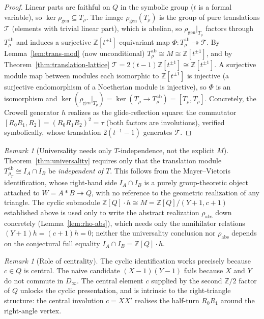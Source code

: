 \documentclass[11pt,a4paper]{article}
\theoremstyle{remark}
\newtheorem{remark}[theorem]{Remark}
\theoremstyle{plain}
\begin{document}
\begin{proof}
Linear parts are faithful on $Q$ in the symbolic group ($t$ is a formal
variable), so $\ker \rho_{\mathrm{gen}} \subseteq T_\rho$.  The
image $\rho_{\mathrm{gen}}(T_\rho)$ is the group of pure translations
$\mathcal{T}$ (elements with trivial linear part), which is abelian, so
$\rho_{\mathrm{gen}}|_{T_\rho}$ factors through
$T_\rho^{\mathrm{ab}}$ and induces a surjective
$\mathbb{Z}[t^{\pm 1}]$-equivariant map
$\Phi \colon T_\rho^{\mathrm{ab}} \twoheadrightarrow \mathcal{T}$.
By Lemma~\ref{lem:trans-mod} (now unconditional)
$T_\rho^{\mathrm{ab}} \cong M \cong \mathbb{Z}[t^{\pm 1}]$, and by
Theorem~\ref{thm:translation-lattice}
$\mathcal{T} = 2(t-1)\mathbb{Z}[t^{\pm 1}] \cong
\mathbb{Z}[t^{\pm 1}]$.  A surjective module map between modules each
isomorphic to $\mathbb{Z}[t^{\pm 1}]$ is injective (a surjective
endomorphism of a Noetherian module is injective), so $\Phi$ is an
isomorphism and
$\ker(\rho_{\mathrm{gen}}|_{T_\rho}) = \ker(T_\rho \to
T_\rho^{\mathrm{ab}}) = [T_\rho, T_\rho]$.  Concretely, the Crowell
generator $h$ realizes as the glide-reflection square: the commutator
$[R_0R_1, R_2] = (R_0R_1R_2)^2 = \tau$ (both factors are involutions),
verified symbolically, whose translation $2(t^{-1}-1)$ generates
$\mathcal{T}$.
\end{proof}

\begin{remark}[Universality needs only $T$-independence, not the explicit $M$]
\label{rem:univ-robust}
Theorem~\ref{thm:universality} requires only that the translation module
$T_{\rho_T}^{\mathrm{ab}} \cong I_A \cap I_B$ be \emph{independent of $T$}.
This follows from the Mayer--Vietoris identification, whose right-hand
side $I_A \cap I_B$ is a purely group-theoretic object attached to
$W = A * B \twoheadrightarrow Q$, with no reference to the geometric
realization of any triangle.  The cyclic submodule
$\mathbb{Z}[Q]\cdot h \cong M = \mathbb{Z}[Q]/(Y+1, c+1)$ established above
is used only to write the abstract realization $\rho_{\mathrm{abs}}$ down
concretely (Lemma~\ref{lem:rho-abs}), which needs only the annihilator
relations $(Y+1)h = (c+1)h = 0$; neither the universality conclusion nor
$\rho_{\mathrm{abs}}$ depends on the conjectural full equality
$I_A \cap I_B = \mathbb{Z}[Q]\cdot h$.
\end{remark}

\begin{remark}[Role of centrality]
\label{rem:univ-centrality}
The cyclic identification works precisely because $c \in Q$ is central.
The naive candidate $(X-1)(Y-1)$ fails because $X$ and $Y$ do not
commute in $D_\infty$.  The central element $c$ supplied by the second
$\mathbb{Z}/2$ factor of $Q$ unlocks the cyclic presentation, and is
intrinsic to the right-triangle structure: the central involution
$c = X X'$ realises the half-turn $R_0 R_1$ around the right-angle
vertex.
\end{remark}
\end{document}
